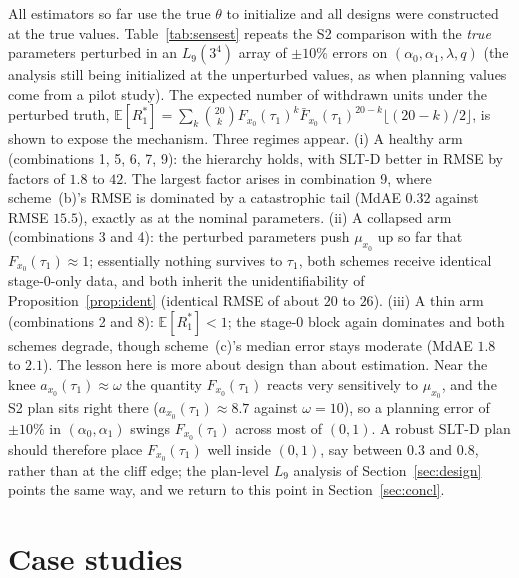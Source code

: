 \documentclass[11pt]{article}
\newcommand{\E}{\mathbb{E}}
\newcommand{\SLTD}{SLT-D}
\begin{document}
All estimators so far use the true $\theta$ to initialize and all designs were constructed at
the true values. Table~\ref{tab:sensest} repeats the S2 comparison with the \emph{true}
parameters perturbed in an $L_9(3^4)$ array of $\pm10\%$ errors on $(\alpha_0,\alpha_1,\lambda,q)$
(the analysis still being initialized at the unperturbed values, as when planning values come
from a pilot study). The expected number of withdrawn units under the perturbed truth,
$\E[R_1^{*}]=\sum_k\binom{20}{k}F_{x_0}(\tau_1)^k\bar F_{x_0}(\tau_1)^{20-k}\lfloor(20-k)/2\rfloor$,
is shown to expose the mechanism. Three regimes appear. (i) A healthy arm (combinations 1, 5,
6, 7, 9): the hierarchy holds, with \SLTD{} better in RMSE by factors of $1.8$ to $42$. The
largest factor arises in combination 9, where scheme~(b)'s RMSE is dominated by a catastrophic
tail (MdAE $0.32$ against RMSE $15.5$), exactly as at the nominal parameters. (ii) A collapsed
arm (combinations 3 and 4): the perturbed parameters push $\mu_{x_0}$ up so far that
$F_{x_0}(\tau_1)\approx1$; essentially nothing survives to $\tau_1$, both schemes receive
identical stage-0-only data, and both inherit the unidentifiability of
Proposition~\ref{prop:ident} (identical RMSE of about $20$ to $26$). (iii) A thin arm
(combinations 2 and 8): $\E[R_1^{*}]<1$; the stage-0 block again dominates and both schemes
degrade, though scheme~(c)'s median error stays moderate (MdAE $1.8$ to $2.1$).
The lesson here is more about design than about estimation. Near the knee
$a_{x_0}(\tau_1)\approx\omega$ the quantity $F_{x_0}(\tau_1)$ reacts very sensitively to
$\mu_{x_0}$, and the S2 plan sits right there ($a_{x_0}(\tau_1)\approx8.7$ against
$\omega=10$), so a planning error of $\pm10\%$ in $(\alpha_0,\alpha_1)$ swings
$F_{x_0}(\tau_1)$ across most of $(0,1)$. A robust \SLTD{} plan should therefore place
$F_{x_0}(\tau_1)$ well inside $(0,1)$, say between $0.3$ and $0.8$, rather than at the cliff
edge; the plan-level $L_9$ analysis of Section~\ref{sec:design} points the same way, and we
return to this point in Section~\ref{sec:concl}.

\begin{table}[t]
\centering\small
\caption{Estimation robustness: $L_9(3^4)$ array of $\pm10\%$ errors in the true parameters
(S2, 300 replications per combination; errors of $\ln\hat\xi_{0.1}(0)$).}
\label{tab:sensest}

\end{table}

\section{Case studies}\label{sec:case}
\end{document}
